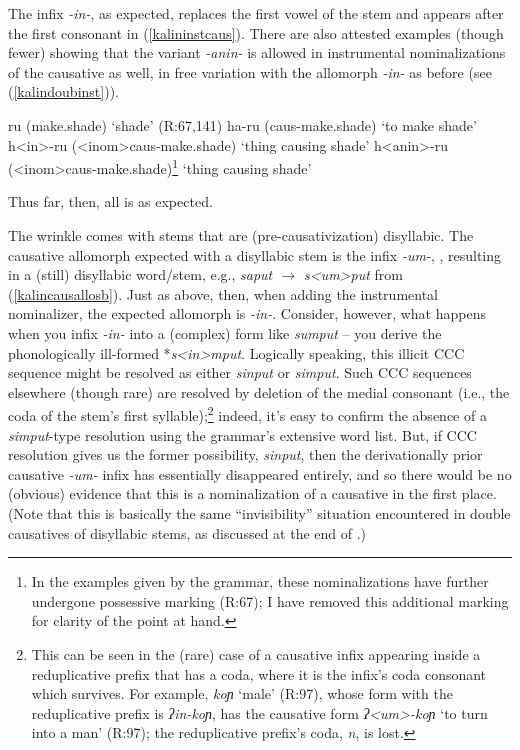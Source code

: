 \documentclass[output=paper]{langscibook}
\begin{document}
\noindent The infix \textit{-in-}, as expected, replaces the first vowel of the stem and appears after the first consonant in (\ref{kalininstcaus}). There are also attested examples (though fewer) showing that the variant \textit{-anin-} is allowed in instrumental nominalizations of the causative as well, in free variation with the allomorph \textit{-in-} as before (see (\ref{kalindoubinst})).

\ea \ea ru (make.shade) \hfill `shade' (R:67,141)
\ex ha-ru ({\sc caus-}make.shade) \hfill `to make shade'
\ex h<in>-ru ({\sc <inom>caus-}make.shade) \hfill `thing causing shade'
\ex h<anin>-ru ({\sc <inom>caus-}make.shade)\footnote{In the examples given by the grammar, these nominalizations have further undergone possessive marking (R:67); I have removed this additional marking for clarity of the point at hand.} \hfill `thing causing shade'
\z
\z

\noindent Thus far, then, all is as expected.

The wrinkle comes with stems that are (pre-causativization) disyllabic. The causative allomorph expected with a disyllabic stem is the infix \textit{-um-}, , resulting in a (still) disyllabic word/stem, e.g., \textit{saput $\rightarrow$ s<um>put} from (\ref{kalincausallosb}). Just as above, then, when adding the instrumental nominalizer, the expected allomorph is \textit{-in-}. Consider, however, what happens when you infix \textit{-in-} into a (complex) form like \textit{sumput} -- you derive the phonologically ill-formed *\textit{s<in>mput}. Logically speaking, this illicit CCC sequence might be resolved as either \textit{si{np}ut} or \textit{si{mp}ut}. Such CCC sequences elsewhere (though rare) are resolved by deletion of the medial consonant (i.e., the coda of the stem's first syllable);\footnote{This can be seen in the (rare) case of a causative infix appearing inside a reduplicative prefix that has a coda, where it is the infix's coda consonant which survives. For example, \textit{koɲ} `male' (R:97), whose form with the reduplicative prefix is \textit{ʔin-koɲ}, has the causative form \textit{ʔ<um>-koɲ} `to turn into a man' (R:97); the reduplicative prefix's coda, \textit{n}, is lost.\label{kalinCCCfn}} indeed, it's easy to confirm the absence of a \textit{si{mp}ut}-type resolution using the grammar's extensive word list. But, if CCC resolution gives us the former possibility, \textit{sinput}, then the derivationally prior causative \textit{-um-} infix has essentially disappeared entirely, and so there would be no (obvious) evidence that this is a nominalization of a causative in the first place. (Note that this is basically the same ``invisibility'' situation encountered in double causatives of disyllabic stems, as discussed at the end of .)
\end{document}
